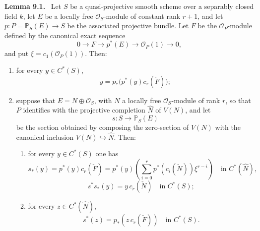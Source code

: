 \documentclass[11pt]{article}
\newenvironment{statement}[1]{\par\medskip\noindent\textbf{#1.}\ }{\par\medskip}
\begin{document}
\label{sga5:VII:lemma:9.1}\begin{statement}{Lemma 9.1}
Let $S$ be a quasi-projective smooth scheme over a separably closed field $k$, let $E$ be a locally free $\mathcal O_S$-module of constant rank $r+1$, and let $p:P=\mathbb P_S(E)\to S$ be the associated projective bundle. Let $F$ be the $\mathcal O_P$-module defined by the canonical exact sequence
\[
0\to F\to p^*(E)\to\mathcal O_P(1)\to0,
\tag{9.1.0}\label{sga5:VII:equation:9.1.0}
\]
and put $\xi=c_1(\mathcal O_P(1))$. Then:
\begin{enumerate}[label=(\roman*)]
\item for every $y\in C^*(S)$,
\[
y=p_*\bigl(p^*(y)c_r(\check F)\bigr);
\tag{9.1.1}\label{sga5:VII:equation:9.1.1}
\]
\item suppose that $E=N\oplus\mathcal O_S$, with $N$ a locally free $\mathcal O_S$-module of rank $r$, so that $P$ identifies with the projective completion $\widehat N$ of $V(N)$, and let
\[
s:S\to\mathbb P_S(E)
\]
be the section obtained by composing the zero-section of $V(N)$ with the canonical inclusion $V(N)\hookrightarrow\widehat N$. Then:
\begin{enumerate}[label=(\alph*)]
\item for every $y\in C^*(S)$ one has
\[
s_*(y)=p^*(y)c_r(\check F)=p^*(y)\left(\sum_{i=0}^r p^*(c_i(\check N))\xi^{r-i}\right)
\quad\text{in }C^*(\widehat N),
\tag{9.1.2}\label{sga5:VII:equation:9.1.2}
\]
\[
s^*s_*(y)=y\,c_r(\check N)\quad\text{in }C^*(S);
\tag{9.1.3}\label{sga5:VII:equation:9.1.3}
\]
\item for every $z\in C^*(\widehat N)$,
\[
s^*(z)=p_*(z\,c_r(\check F))\quad\text{in }C^*(S).
\tag{9.1.4}\label{sga5:VII:equation:9.1.4}
\]
\end{enumerate}
\end{enumerate}
\end{statement}
\end{document}
